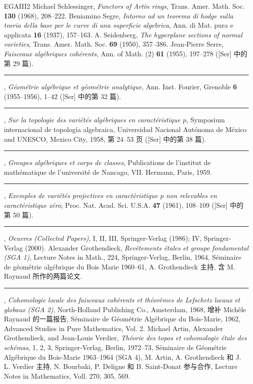 \begin{thebibliography}{EGAIII2}
 Michael Schlessinger, \emph{Functors of Artin rings}, Trans. Amer. Math. Soc. \textbf{130} (1968), 208--222.
 Beniamino Segre, \emph{Intorno ad un teorema di hodge sulla teoria della base per le curve di una superficie algebrica}, Ann. di Mat. pura e applicata \textbf{16} (1937), 157--163.
 A. Seidenberg, \emph{The hyperplane sections of normal varieties}, Trans. Amer. Math. Soc. \textbf{69} (1950), 357--386.
 Jean-Pierre Serre, \emph{Faisceaux algébriques cohérents}, Ann. of Math. (2) \textbf{61} (1955), 197--278 ([Ser] 中的第 29 篇).
 \rule{2em}{.3pt}, \emph{Géométrie algébrique et géométrie analytique}, Ann. Inst. Fourier, Grenoble \textbf{6} (1955--1956), 1--42 ([Ser] 中的第 32 篇).
 \rule{2em}{.3pt}, \emph{Sur la topologie des variétés algébriques en caractéristique $p$}, Symposium internacional de topología algebraica, Universidad Nacional Autónoma de México and UNESCO, Mexico City, 1958, 第 24--53 页 ([Ser] 中的第 38 篇).
 \rule{2em}{.3pt}, \emph{Groupes algébriques et corps de classes}, Publications de l'institut de mathématique de l'université de Nancago, VII. Hermann, Paris, 1959.
 \rule{2em}{.3pt}, \emph{Exemples de variétés projectives en caractéristique $p$ non relevables en caractéristique zéro}, Proc. Nat. Acad. Sci. U.S.A. \textbf{47} (1961), 108--109 ([Ser] 中的第 50 篇).
 \rule{2em}{.3pt}, \emph{Oeuvres (Collected Papers)}, I, II, III, Springer-Verlag (1986); IV, Springer-Verlag (2000).
 Alexander Grothendieck, \emph{Revêtements étales et groupe fondamental (SGA 1)}, Lecture Notes in Math., 224, Springer-Verlag, Berlin, 1964, Séminaire de géométrie algébrique du Bois Marie 1960--61, A. Grothendieck 主持, 含 M. Raynaud 所作的两篇论文.
 \rule{2em}{.3pt}, \emph{Cohomologie locale des faisceaux cohérents et théorèmes de Lefschetz locaux et globaux (SGA 2)}, North-Holland Publishing Co., Amsterdam, 1968, 增补 Michèle Raynaud 的一篇报告, Séminaire de Géométrie Algébrique du Bois-Marie, 1962, Advanced Studies in Pure Mathematics, Vol. 2.
 Michael Artin, Alexander Grothendieck, and Jean-Louis Verdier, \emph{Théorie des topos et cohomologie étale des schémas}, 1, 2, 3, Springer-Verlag, Berlin, 1972--73, Séminaire de Géométrie Algébrique du Bois-Marie 1963--1964 (SGA 4), M. Artin, A. Grothendieck 和 J. L. Verdier 主持, N. Bourbaki, P. Deligne 和 B. Saint-Donat 参与合作, Lecture Notes in Mathematics, Voll. 270, 305, 569.

\end{thebibliography}
